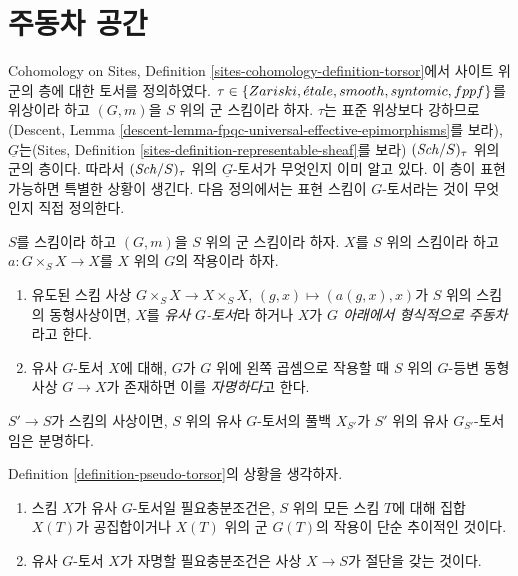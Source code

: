 \section{주동차 공간}
\label{section-principal-homogeneous}

\noindent
Cohomology on Sites, Definition \ref{sites-cohomology-definition-torsor}에서 사이트 위 군의 층에 대한 토서를 정의하였다.
$\tau \in \{Zariski, {\acute{e}tale}, smooth, syntomic, fppf\}$를 위상이라 하고 $(G, m)$을 $S$ 위의 군 스킴이라 하자.
$\tau$는 표준 위상보다 강하므로(Descent, Lemma
\ref{descent-lemma-fpqc-universal-effective-epimorphisms}를 보라), $\underline{G}$는(Sites, Definition
\ref{sites-definition-representable-sheaf}를 보라) $(\mathit{Sch}/S)_\tau$ 위의 군의 층이다. 따라서 $(\mathit{Sch}/S)_\tau$ 위의
$\underline{G}$-토서가 무엇인지 이미 알고 있다. 이 층이 표현 가능하면 특별한 상황이 생긴다. 다음 정의에서는
표현 스킴이 $G$-토서라는 것이 무엇인지 직접 정의한다.

\begin{definition}
\label{definition-pseudo-torsor}
$S$를 스킴이라 하고 $(G, m)$을 $S$ 위의 군 스킴이라 하자. $X$를 $S$ 위의 스킴이라 하고
$a : G \times_S X \to X$를 $X$ 위의 $G$의 작용이라 하자.
\begin{enumerate}
\item 유도된 스킴 사상 $G \times_S X \to X \times_S X$,
$(g, x) \mapsto (a(g, x), x)$가 $S$ 위의 스킴의 동형사상이면, $X$를 {\it 유사 $G$-토서}라 하거나
$X$가 {\it $G$ 아래에서 형식적으로 주동차}라고 한다.
\item 유사 $G$-토서 $X$에 대해, $G$가 $G$ 위에 왼쪽 곱셈으로 작용할 때 $S$ 위의 $G$-등변 동형사상
$G \to X$가 존재하면 이를 {\it 자명하다}고 한다.
\end{enumerate}
\end{definition}

\noindent
$S' \to S$가 스킴의 사상이면, $S$ 위의 유사 $G$-토서의 풀백 $X_{S'}$가 $S'$ 위의 유사
$G_{S'}$-토서임은 분명하다.

\begin{lemma}
\label{lemma-characterize-trivial-pseudo-torsors}
Definition \ref{definition-pseudo-torsor}의 상황을 생각하자.
\begin{enumerate}
\item 스킴 $X$가 유사 $G$-토서일 필요충분조건은, $S$ 위의 모든 스킴 $T$에 대해 집합 $X(T)$가 공집합이거나
$X(T)$ 위의 군 $G(T)$의 작용이 단순 추이적인 것이다.
\item 유사 $G$-토서 $X$가 자명할 필요충분조건은 사상 $X \to S$가 절단을 갖는 것이다.
\end{enumerate}
\end{lemma}

